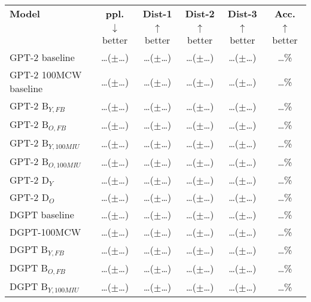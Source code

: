 \begin{table*}[h]
    \centering
    \begin{tabular}{l c c c c c}
    \toprule
    \textbf{Model} & \textbf{ppl.} & \textbf{Dist-1} & \textbf{Dist-2} & \textbf{Dist-3} & \textbf{Acc.}\\
     & $\downarrow$ better & $\uparrow$ better & $\uparrow$ better & $\uparrow$ better & $\uparrow$ better\\
    \midrule
    \midrule
    GPT-2 baseline & \dots ($\pm$\dots) & \dots ($\pm$\dots) & \dots ($\pm$\dots) & \dots ($\pm$\dots) & \dots\%\\
    GPT-2 100MCW baseline & \dots ($\pm$\dots) & \dots ($\pm$\dots) & \dots ($\pm$\dots) & \dots ($\pm$\dots) & \dots\%\\
    \midrule
    GPT-2 B$_{Y, FB}$ & \dots ($\pm$\dots) & \dots ($\pm$\dots) & \dots ($\pm$\dots) & \dots ($\pm$\dots) & \dots\%\\
    GPT-2 B$_{O, FB}$ & \dots ($\pm$\dots) & \dots ($\pm$\dots) & \dots ($\pm$\dots) & \dots ($\pm$\dots) & \dots\%\\
    GPT-2 B$_{Y, 100MIU}$ & \dots ($\pm$\dots) & \dots ($\pm$\dots) & \dots ($\pm$\dots) & \dots ($\pm$\dots) & \dots\%\\
    GPT-2 B$_{O, 100MIU}$ & \dots ($\pm$\dots) & \dots ($\pm$\dots) & \dots ($\pm$\dots) & \dots ($\pm$\dots) & \dots\%\\
    \midrule
    GPT-2 D$_{Y}$ & \dots ($\pm$\dots) & \dots ($\pm$\dots) & \dots ($\pm$\dots) & \dots ($\pm$\dots) & \dots\%\\
    GPT-2 D$_{O}$ & \dots ($\pm$\dots) & \dots ($\pm$\dots) & \dots ($\pm$\dots) & \dots ($\pm$\dots) & \dots\%\\
    \midrule
    \midrule
    DGPT baseline & \dots ($\pm$\dots) & \dots ($\pm$\dots) & \dots ($\pm$\dots) & \dots ($\pm$\dots) & \dots\%\\
    DGPT-100MCW & \dots ($\pm$\dots) & \dots ($\pm$\dots) & \dots ($\pm$\dots) & \dots ($\pm$\dots) & \dots\%\\
    \midrule
    DGPT B$_{Y, FB}$ & \dots ($\pm$\dots) & \dots ($\pm$\dots) & \dots ($\pm$\dots) & \dots ($\pm$\dots) & \dots\%\\
    DGPT B$_{O, FB}$ & \dots ($\pm$\dots) & \dots ($\pm$\dots) & \dots ($\pm$\dots) & \dots ($\pm$\dots) & \dots\%\\
    DGPT B$_{Y, 100MIU}$ & \dots ($\pm$\dots) & \dots ($\pm$\dots) & \dots ($\pm$\dots) & \dots ($\pm$\dots) & \dots\%\\

\end{tabular}
\end{table*}
